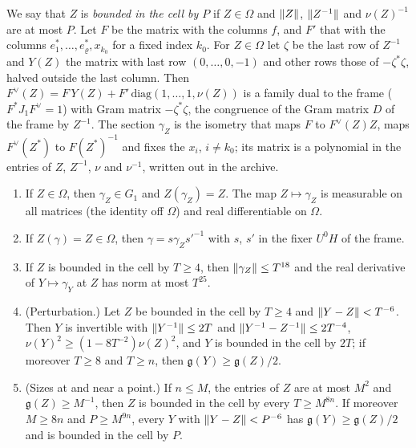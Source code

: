 We say that $Z$ is \emph{bounded in the cell by $P$} if $Z\in\Omega$ and $\lVert Z\rVert$, $\lVert Z^{-1}\rVert$ and $\nu(Z)^{-1}$ are at most $P$. Let $F$ be the matrix with the columns $f$, and $F'$ that with the columns
$e^*_1,\dots,e^*_\varrho,x_{k_0}$ for a fixed index $k_0$. For $Z\in\Omega$ let $\zeta$ be the last row of $Z^{-1}$ and $Y(Z)$ the matrix with last row $(0,\dots,0,-1)$ and other rows those of $-\zeta^*\zeta$, halved outside the last
column. Then $F^\vee(Z)=F\,Y(Z)+F'\,\mathrm{diag}(1,\dots,1,\nu(Z))$ is a family dual to the frame ($F^*J_1F^\vee=1$) with Gram matrix $-\zeta^*\zeta$, the congruence of the Gram matrix $D$ of the frame by $Z^{-1}$. The section $\gamma_Z$ is the isometry
that maps $F$ to $F^\vee(Z)Z$, maps $F^\vee(Z^*)$ to $F(Z^*)^{-1}$ and fixes the $x_i$, $i\ne k_0$; its matrix is a polynomial in the entries of $Z$, $Z^{-1}$, $\nu$ and $\nu^{-1}$, written out in the archive.

\begin{proposition}\label{prop:gram-section}
\begin{enumerate}[label=\textup{(\alph*)}]
\item If $Z\in\Omega$, then $\gamma_Z\in G_1$ and $Z(\gamma_Z)=Z$. The map $Z\mapsto\gamma_Z$ is measurable on all matrices (the identity off $\Omega$) and real differentiable on $\Omega$.
\item If $Z(\gamma)=Z\in\Omega$, then $\gamma=s\gamma_Zs'^{-1}$ with $s$, $s'$ in the fixer $U^0H$ of the frame.
\item If $Z$ is bounded in the cell by $T\ge4$, then $\lVert \gamma_Z\rVert\le T^{18}$ and the real derivative of $Y\mapsto\gamma_Y$ at $Z$ has norm at most $T^{25}$.
\item (Perturbation.) Let $Z$ be bounded in the cell by $T\ge4$ and $\lVert Y-Z\rVert<T^{-6}$. Then $Y$ is invertible with $\lVert Y^{-1}\rVert\le2T$ and $\lVert Y^{-1}-Z^{-1}\rVert\le2T^{-4}$, $\nu(Y)^2\ge(1-8T^{-2})\nu(Z)^2$, and $Y$ is bounded in the cell by
$2T$; if moreover $T\ge8$ and $T\ge n$, then $\mathfrak g(Y)\ge\mathfrak g(Z)/2$.
\item (Sizes at and near a point.) If $n\le M$, the entries of $Z$ are at most $M^2$ and $\mathfrak g(Z)\ge M^{-1}$, then $Z$ is bounded in the cell by every $T\ge M^{8n}$. If moreover $M\ge8n$ and $P\ge M^{9n}$, every $Y$ with
$\lVert Y-Z\rVert<P^{-6}$ has $\mathfrak g(Y)\ge\mathfrak g(Z)/2$ and is bounded in the cell by $P$.
\end{enumerate}
\end{proposition}

